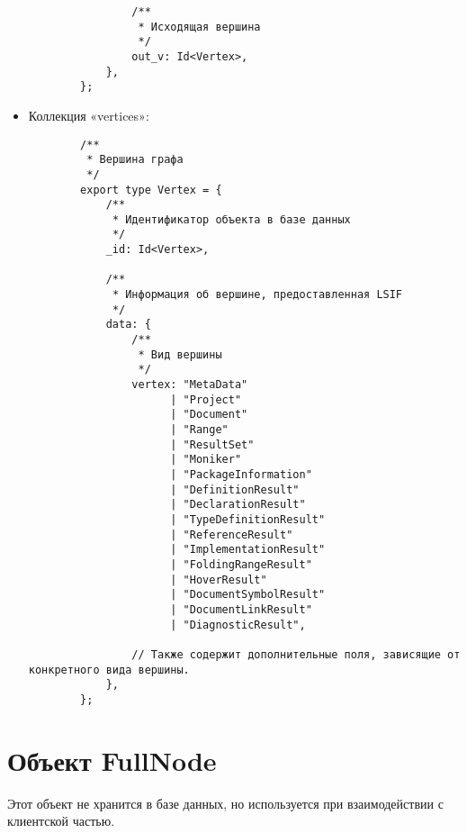 \begin{itemize}
\begin{verbatim}
                /**
                 * Исходящая вершина
                 */
                out_v: Id<Vertex>,
            },
        };
        \end{verbatim}
        
    \item Коллекция «vertices»:
        \begin{verbatim}
        /**
         * Вершина графа
         */
        export type Vertex = {
            /**
             * Идентификатор объекта в базе данных
             */
            _id: Id<Vertex>,
            
            /**
             * Информация об вершине, предоставленная LSIF
             */
            data: {
                /**
                 * Вид вершины
                 */
                vertex: "MetaData"
                      | "Project"
                      | "Document"
                      | "Range"
                      | "ResultSet"
                      | "Moniker"
                      | "PackageInformation"
                      | "DefinitionResult"
                      | "DeclarationResult"
                      | "TypeDefinitionResult"
                      | "ReferenceResult"
                      | "ImplementationResult"
                      | "FoldingRangeResult"
                      | "HoverResult"
                      | "DocumentSymbolResult"
                      | "DocumentLinkResult"
                      | "DiagnosticResult",
                
                // Также содержит дополнительные поля, зависящие от конкретного вида вершины.
            },
        };
        \end{verbatim}
\end{itemize}

\section{Объект FullNode}
\label{models:fullnode}

Этот объект не хранится в базе данных, но используется при взаимодействии с клиентской частью.

